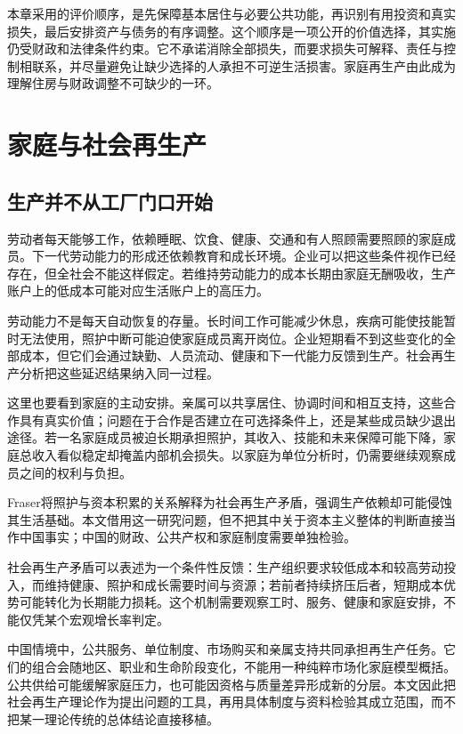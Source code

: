 \documentclass[UTF8,fontset=fandol,zihao=-4,oneside,openany]{ctexbook}
\begin{document}
本章采用的评价顺序，是先保障基本居住与必要公共功能，再识别有用投资和真实损失，最后安排资产与债务的有序调整。这个顺序是一项公开的价值选择，其实施仍受财政和法律条件约束。它不承诺消除全部损失，而要求损失可解释、责任与控制相联系，并尽量避免让缺少选择的人承担不可逆生活损害。家庭再生产由此成为理解住房与财政调整不可缺少的一环。

\chapter{家庭与社会再生产}
\section{生产并不从工厂门口开始}
劳动者每天能够工作，依赖睡眠、饮食、健康、交通和有人照顾需要照顾的家庭成员。下一代劳动能力的形成还依赖教育和成长环境。企业可以把这些条件视作已经存在，但全社会不能这样假定。若维持劳动能力的成本长期由家庭无酬吸收，生产账户上的低成本可能对应生活账户上的高压力。

\label{arg:P137}
劳动能力不是每天自动恢复的存量。长时间工作可能减少休息，疾病可能使技能暂时无法使用，照护中断可能迫使家庭成员离开岗位。企业短期看不到这些变化的全部成本，但它们会通过缺勤、人员流动、健康和下一代能力反馈到生产。社会再生产分析把这些延迟结果纳入同一过程。

这里也要看到家庭的主动安排。亲属可以共享居住、协调时间和相互支持，这些合作具有真实价值；问题在于合作是否建立在可选择条件上，还是某些成员缺少退出途径。若一名家庭成员被迫长期承担照护，其收入、技能和未来保障可能下降，家庭总收入看似稳定却掩盖内部机会损失。以家庭为单位分析时，仍需要继续观察成员之间的权利与负担。

Fraser将照护与资本积累的关系解释为社会再生产矛盾，强调生产依赖却可能侵蚀其生活基础。本文借用这一研究问题，但不把其中关于资本主义整体的判断直接当作中国事实；中国的财政、公共产权和家庭制度需要单独检验。\cite{Fraser2016}

\label{arg:P138}
社会再生产矛盾可以表述为一个条件性反馈：生产组织要求较低成本和较高劳动投入，而维持健康、照护和成长需要时间与资源；若前者持续挤压后者，短期成本优势可能转化为长期能力损耗。这个机制需要观察工时、服务、健康和家庭安排，不能仅凭某个宏观增长率判定。

中国情境中，公共服务、单位制度、市场购买和亲属支持共同承担再生产任务。它们的组合会随地区、职业和生命阶段变化，不能用一种纯粹市场化家庭模型概括。公共供给可能缓解家庭压力，也可能因资格与质量差异形成新的分层。本文因此把社会再生产理论作为提出问题的工具，再用具体制度与资料检验其成立范围，而不把某一理论传统的总体结论直接移植。
\end{document}
